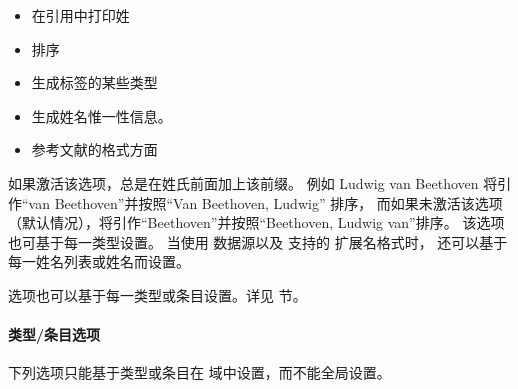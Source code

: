 \begin{optionlist}
\begin{itemize}
\item %
在引用中打印姓
\item %
排序
\item %
生成标签的某些类型
\item %
生成姓名惟一性信息。
\item %
参考文献的格式方面
\end{itemize}
%
如果激活该选项，\biblatex 总是在姓氏前面加上该前缀。
例如 Ludwig van Beethoven 将引作“van Beethoven”并按照“Van Beethoven, Ludwig” 排序，
而如果未激活该选项（默认情况），将引作“Beethoven”并按照“Beethoven, Ludwig van”排序。
该选项也可基于每一类型设置。
当使用 \biblatexml 数据源以及 \biber 支持的 \BibTeX 扩展名格式时，
还可以基于每一姓名列表或姓名而设置。


 选项也可以基于每一类型或条目设置。详见  节。

\end{optionlist}

\paragraph{类型/条目选项}%
\label{use:opt:bib:ded}

下列选项只能基于类型或条目在  域中设置，而不能全局设置。

